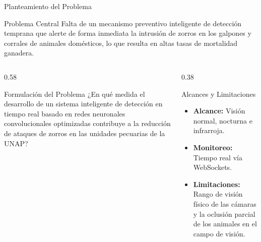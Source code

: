 \documentclass[10pt,aspectratio=169]{beamer}
\begin{document}
\begin{frame}{Planteamiento del Problema}
  \begin{block}{Problema Central}
    \small
    Falta de un mecanismo preventivo inteligente de detección temprana que alerte de forma inmediata la intrusión de zorros en los galpones y corrales de animales domésticos, lo que resulta en altas tasas de mortalidad ganadera.
  \end{block}
  
  \begin{columns}[T]
    \begin{column}{0.58\textwidth}
      \begin{block}{Formulación del Problema}
        \small
        ¿En qué medida el desarrollo de un sistema inteligente de detección en tiempo real basado en redes neuronales convolucionales optimizadas contribuye a la reducción de ataques de zorros en las unidades pecuarias de la UNAP?
      \end{block}
    \end{column}
    
    \begin{column}{0.38\textwidth}
      \begin{block}{Alcances y Limitaciones}
        \scriptsize
        \begin{itemize}
          \item \textbf{Alcance:} Visión normal, nocturna e infrarroja.
          \item \textbf{Monitoreo:} Tiempo real vía WebSockets.
          \item \textbf{Limitaciones:} Rango de visión físico de las cámaras y la oclusión parcial de los animales en el campo de visión.
        \end{itemize}
      \end{block}
    \end{column}
  \end{columns}
\end{frame}
\end{document}

